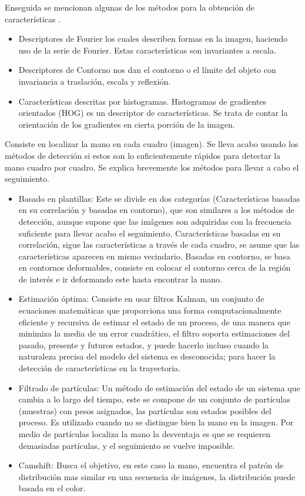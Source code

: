 Enseguida se mencionan algunas de los métodos para la obtención de características \citep{Premaratne2013}. 
\begin{itemize}
\item Descriptores de Fourier los cuales describen formas en la imagen, haciendo uso de la serie de Fourier. Estas características son invariantes a escala.
\item Descriptores de Contorno nos dan el contorno  o el límite del objeto con invariancia a traslación, escala  y reflexión.     
\item Características descritas por histogramas. Histogramas de gradientes orientados (HOG) es un descriptor de características. Se trata de contar la orientación de los gradientes en cierta porción de la imagen.  
\end{itemize}



Consiste en localizar la mano en cada cuadro (imagen). Se lleva acabo usando los métodos de detección si estos son lo suficientemente rápidos para detectar la mano cuadro por cuadro. Se explica brevemente los métodos para llevar a cabo el seguimiento. 
\begin{itemize}
	\item Basado en plantillas: Este se divide en dos categorías (Características basadas en su correlación y basadas en contorno), que son similares a los métodos de detección, aunque supone que las imágenes son adquiridas con la frecuencia suficiente para llevar acabo el seguimiento. Características basadas en su correlación, sigue las características a través de cada cuadro, se asume que las características aparecen en mismo vecindario. Basadas en contorno, se basa en contornos deformables, consiste en colocar el contorno cerca de la región de interés e ir deformando este hasta encontrar la mano. 
	\item Estimación óptima: Consiste en usar filtros Kalman, un conjunto de ecuaciones matemáticas que proporciona una forma  computacionalmente eficiente y recursiva de estimar el estado de un proceso, de una manera que minimiza la media de un error cuadrático, el filtro soporta estimaciones del pasado, presente y futuros estados, y puede hacerlo incluso cuando la naturaleza precisa del modelo del sistema es desconocida;  para hacer la detección de características en la trayectoria. 
	\item Filtrado de partículas: Un método de estimación del estado de un sistema que cambia a lo largo del tiempo, este se compone de un conjunto de partículas (muestras) con pesos asignados, las partículas son estados posibles del proceso. Es utilizado cuando no se distingue bien la mano en la imagen. Por medio de partículas localiza la mano la desventaja es que se requieren demasiadas partículas, y el seguimiento se vuelve imposible. 
	\item Camshift: Busca el objetivo, en este caso la mano, encuentra el patrón de distribución mas similar en una secuencia de imágenes, la distribución puede basada en el color. 
\end{itemize}

